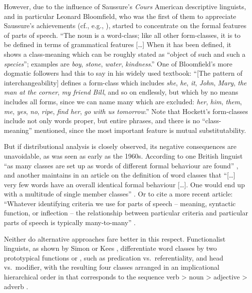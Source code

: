 \documentclass[output=paper]{langsci/langscibook}
\begin{document}
However, due to the influence of Saussure’s \emph{Cours}
\parencite{Saussure1916} American descriptive linguists, and in particular
Leonard Bloomfield, who was the first of them to appreciate Saussure’s
achievements (cf., e.g., \citealt{Koerner1995}), started to concentrate on the
formal features of parts of speech. “The noun is a word-class; like all other
form-classes, it is to be defined in terms of grammatical features [\dots{}] When it
has been defined, it shows a class-meaning which can be roughly stated as
\enquote{object of such and such a \emph{species}}; examples are \emph{boy},
\emph{stone}, \emph{water}, \emph{kindness}.” \citep[202]{Bloomfield1935} One
of Bloomfield’s more dogmatic followers had this to say in his widely used
textbook: “[The pattern of interchangeability] defines a form-class which
includes \emph{she}, \emph{he}, \emph{it}, \emph{John}, \emph{Mary}, \emph{the
man at the corner}, \emph{my friend Bill}, and so on endlessly, but which by no
means includes all forms, since we can name many which are excluded:
\emph{her}, \emph{him}, \emph{them}, \emph{me}, \emph{yes}, \emph{no},
\emph{ripe}, \emph{find her}, \emph{go with us tomorrow}.”
\citep[162]{Hockett1958} Note that Hockett’s form-classes include not only
words proper, but entire phrases, and there is no \enquote{class-meaning}
mentioned, since the most important feature is mutual substitutability.

But if distributional analysis is closely observed, its negative consequences
are unavoidable, as was seen as early as the 1960s. According to one British
linguist \enquote{as many classes are set up as words of different formal
behaviour are found} \parencite[174]{Robins1980}, and another maintains in an
article on the definition of word classes that “[\dots{}] very few words have
an overall identical formal behaviour [\dots{}]. One would end up with a
multitude of single member classes” \citep[28]{Crystal1967}. Or to cite a more
recent article: “Whatever identifying criteria we use for parts of speech –
meaning, syntactic function, or inflection – the relationship between
particular criteria and particular parts of speech is typically many-to-many”
\citep[3]{Anward2000}.

Neither do alternative approaches fare better in this respect. Functionalist
linguists, as shown by Simon \citet{Dik1989} or Kees \citet{Hengeveld1992},
differentiate word classes by two prototypical functions or , such as
predication vs.\ referentiality, and head vs.\ modifier, with the resulting
four classes arranged in an implicational hierarchical order in 
that corresponds to the sequence verb > noun > adjective > adverb
\citep{Hengeveld1992}.
\end{document}
